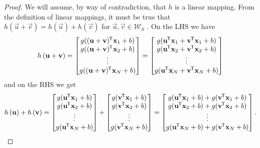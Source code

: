 \begin{proof}
    We will assume, by way of contradiction, that $h$ is a linear mapping. 
    From the definition of linear mappings, it must be true that $h(\vec{u} + \vec{v}) = h(\vec{u}) + h(\vec{v})$ for $\vec{u}, \vec{v} \in \mathcal{W}_S$ \cite{rudin2006}.
    On the LHS we have
    \begin{equation*}
        h \left( \mathbf{u} + \mathbf{v} \right)
        = \begin{bmatrix}
            g((\mathbf{u} + \mathbf{v})^{\mkern-1.5mu\mathsf{T}} \mathbf{x}_1 + b) \\
            g((\mathbf{u} + \mathbf{v})^{\mkern-1.5mu\mathsf{T}} \mathbf{x}_2 + b) \\
            \vdots \\
            g((\mathbf{u} + \mathbf{v})^{\mkern-1.5mu\mathsf{T}} \mathbf{x}_N + b) \\
        \end{bmatrix}
        = \begin{bmatrix}
            g(\mathbf{u}^{\mkern-1.5mu\mathsf{T}} \mathbf{x}_1 + \mathbf{v}^{\mkern-1.5mu\mathsf{T}} \mathbf{x}_1 + b) \\
            g(\mathbf{u}^{\mkern-1.5mu\mathsf{T}} \mathbf{x}_2 + \mathbf{v}^{\mkern-1.5mu\mathsf{T}} \mathbf{x}_2 + b) \\
            \vdots \\
            g(\mathbf{u}^{\mkern-1.5mu\mathsf{T}} \mathbf{x}_N + \mathbf{v}^{\mkern-1.5mu\mathsf{T}} \mathbf{x}_N + b) \\
        \end{bmatrix}
    \end{equation*}
    and on the RHS we get
    \begin{equation*}
        h \left( \mathbf{u} \right) + h \left( \mathbf{v} \right)
        = \begin{bmatrix}
            g(\mathbf{u}^{\mkern-1.5mu\mathsf{T}} \mathbf{x}_1 + b) \\
            g(\mathbf{u}^{\mkern-1.5mu\mathsf{T}} \mathbf{x}_2 + b) \\
            \vdots \\
            g(\mathbf{u}^{\mkern-1.5mu\mathsf{T}} \mathbf{x}_N + b) \\
        \end{bmatrix}
        + \begin{bmatrix}
            g(\mathbf{v}^{\mkern-1.5mu\mathsf{T}} \mathbf{x}_1 + b) \\
            g(\mathbf{v}^{\mkern-1.5mu\mathsf{T}} \mathbf{x}_2 + b) \\
            \vdots \\
            g(\mathbf{v}^{\mkern-1.5mu\mathsf{T}} \mathbf{x}_N + b) \\
        \end{bmatrix}
        = \begin{bmatrix}
            g(\mathbf{u}^{\mkern-1.5mu\mathsf{T}} \mathbf{x}_1 + b) + g(\mathbf{v}^{\mkern-1.5mu\mathsf{T}} \mathbf{x}_1 + b) \\
            g(\mathbf{u}^{\mkern-1.5mu\mathsf{T}} \mathbf{x}_2 + b) + g(\mathbf{v}^{\mkern-1.5mu\mathsf{T}} \mathbf{x}_2 + b) \\
            \vdots \\
            g(\mathbf{u}^{\mkern-1.5mu\mathsf{T}} \mathbf{x}_N + b) + g(\mathbf{v}^{\mkern-1.5mu\mathsf{T}} \mathbf{x}_N + b) \\
        \end{bmatrix}.
    \end{equation*}


\end{proof}
